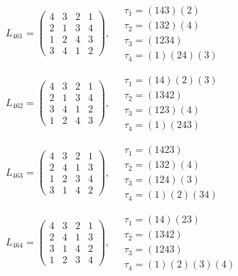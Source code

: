 $L_{461} = \begin{pmatrix} 4 & 3 & 2 & 1 \\ 2 & 1 & 3 & 4 \\ 1 & 2 & 4 & 3 \\ 3 & 4 & 1 & 2 \end{pmatrix}, \quad \begin{matrix} \tau_{1} = (1 4 3)(2) \\ \tau_{2} = (1 3 2)(4) \\ \tau_{3} = (1 2 3 4) \\ \tau_{4} = (1)(2 4)(3) \end{matrix}$

$L_{462} = \begin{pmatrix} 4 & 3 & 2 & 1 \\ 2 & 1 & 3 & 4 \\ 3 & 4 & 1 & 2 \\ 1 & 2 & 4 & 3 \end{pmatrix}, \quad \begin{matrix} \tau_{1} = (1 4)(2)(3) \\ \tau_{2} = (1 3 4 2) \\ \tau_{3} = (1 2 3)(4) \\ \tau_{4} = (1)(2 4 3) \end{matrix}$

$L_{463} = \begin{pmatrix} 4 & 3 & 2 & 1 \\ 2 & 4 & 1 & 3 \\ 1 & 2 & 3 & 4 \\ 3 & 1 & 4 & 2 \end{pmatrix}, \quad \begin{matrix} \tau_{1} = (1 4 2 3) \\ \tau_{2} = (1 3 2)(4) \\ \tau_{3} = (1 2 4)(3) \\ \tau_{4} = (1)(2)(3 4) \end{matrix}$

$L_{464} = \begin{pmatrix} 4 & 3 & 2 & 1 \\ 2 & 4 & 1 & 3 \\ 3 & 1 & 4 & 2 \\ 1 & 2 & 3 & 4 \end{pmatrix}, \quad \begin{matrix} \tau_{1} = (1 4)(2 3) \\ \tau_{2} = (1 3 4 2) \\ \tau_{3} = (1 2 4 3) \\ \tau_{4} = (1)(2)(3)(4) \end{matrix}$

